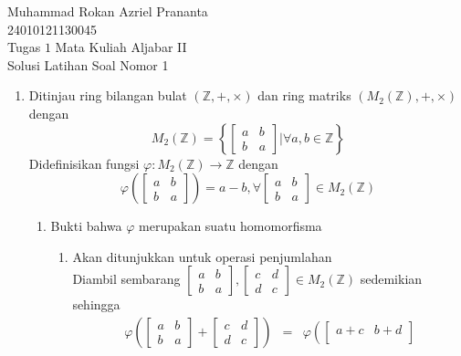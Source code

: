\documentclass[12pt,A4paper]{article}
\begin{document}
\begin{center}
	Muhammad Rokan Azriel Prananta
	\\ 24010121130045
	\\ Tugas $1$ Mata Kuliah Aljabar II
	\\ Solusi Latihan Soal Nomor 1
\end{center}
\begin{enumerate}
	\item Ditinjau ring bilangan bulat $\left( \mathbb{Z}, +, \times\right)$ dan ring matriks $\left(M_2\left(\mathbb{Z}\right), +, \times\right)$ dengan
	\[ M_2(\mathbb{Z}) = \left\lbrace\begin{bmatrix}
		a & b \\
		b & a
	\end{bmatrix} | \forall a,b \in \mathbb{Z}\right\rbrace \]
	Didefinisikan fungsi $\varphi : M_2(\mathbb{Z}) \rightarrow \mathbb{Z}$ dengan
	\[ \varphi \left( \begin{bmatrix}
		a & b \\
		b & a
	\end{bmatrix}\right) = a - b, \forall \begin{bmatrix}
	a & b\\
	b & a
\end{bmatrix} \in M_2(\mathbb{Z})\]
\begin{enumerate}
	\item Bukti bahwa $\varphi$ merupakan suatu homomorfisma
	 \begin{enumerate}
	 	\item Akan ditunjukkan untuk operasi penjumlahan 
	 	\\ Diambil sembarang $\begin{bmatrix}
	 		a & b\\
	 		b & a
	 	\end{bmatrix}, \begin{bmatrix}
	 	c & d\\
	 	d & c
 	\end{bmatrix} \in M_2(\mathbb{Z})$ sedemikian sehingga
 	\begin{eqnarray*}
 		\varphi \left(\begin{bmatrix}
 			a & b\\
 			b & a
 		\end{bmatrix} + \begin{bmatrix}
 		c & d\\
 		d & c
 	\end{bmatrix}  \right) &=& \varphi \left(\begin{bmatrix}
 	a+c & b+d\\

\end{bmatrix}
\end{eqnarray*}
\end{enumerate}
\end{enumerate}
\end{enumerate}
\end{document}
